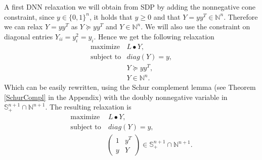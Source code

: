 \documentclass[12pt]{book}
\theoremstyle{definition}
\begin{document}
A first DNN relaxation we will obtain from SDP by adding the nonnegative cone constraint, since $y\in\{0,1\}^n$, it holds that $y\geq 0$ and that $Y = yy^T \in \mathbb{N}^n$. 
Therefore we can relax $Y = yy^T$ as $Y\succeq yy^T$ and $Y\in\mathbb{N}^n$.
We will also use the constraint on diagonal entries $Y_{ii} = y_i^2 = y_i$. Hence we get the following relaxation
\begin{equation}
\begin{array}{ll}
\mbox{maximize} & L\bullet Y, \\
\mbox{subject to} & diag(Y) = y , \\
				& Y\succeq yy^T, \\
				& Y\in\mathbb{N}^n.
\end{array}	
\end{equation}
Which can be easily rewritten, using the Schur complement lemma (see Theorem \ref{SchurCompl} in the Appendix) with the doubly nonnegative variable in $ \mathbb{S}^{n+1}_+ \cap \mathbb{N}^{n+1}$. 
The resulting relaxation is 
\begin{equation}
\label{MaxCutDNNRelax1}
\begin{array}{ll}
\mbox{maximize} & \ L\bullet Y, \\
\mbox{subject to} & \ diag(Y) = y , \\
				& \left(\begin{array}{ll} 1 & y^T \\ y & Y \end{array}\right)\in\mathbb{S}^{n+1}_+ \cap \mathbb{N}^{n+1}.
\end{array}	
\end{equation}
\end{document}
